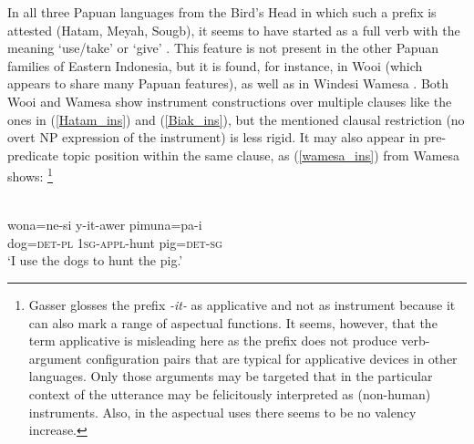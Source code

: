 In all three Papuan languages from the Bird's Head in which such a prefix is attested (Hatam, Meyah, Sougb), it seems to have started as a full verb with the meaning `use/take' or `give' \citep[194]{reesink2005west}. This feature is not present in the other Papuan families of Eastern Indonesia, but it is found, for instance, in Wooi (which appears to share many Papuan features), as well as in Windesi Wamesa \citep[188ff]{gasser2014windesi}. Both Wooi and Wamesa show instrument constructions over multiple clauses like the ones in (\ref{Hatam_ins}) and (\ref{Biak_ins}), but the mentioned clausal restriction (no overt NP expression of the instrument) is less rigid. It may also appear in pre-predicate topic position within the same clause, as (\ref{wamesa_ins}) from Wamesa shows: \footnote{Gasser glosses the prefix \textit{-it-} as applicative and not as instrument because it can also mark a range of aspectual functions. It seems, however, that the term applicative is misleading here as the prefix does not produce verb-argument configuration pairs that are typical for applicative devices in other languages. Only those arguments may be targeted that in the particular context of the utterance may be felicitously interpreted as (non-human) instruments. Also, in the aspectual uses there seems to be no valency increase.}

\ea \label{wamesa_ins} 
\\
\gll wona=ne-si y-it-awer pimuna=pa-i \\
dog=\textsc{det}-\textsc{pl} \textsc{1}\textsc{sg}-\textsc{appl}-hunt pig=\textsc{det}-\textsc{sg} \\
\glft `I use the dogs to hunt the pig.'\\ 
\z

